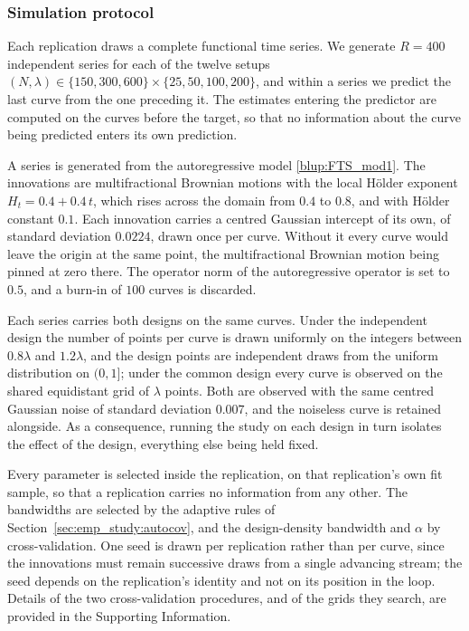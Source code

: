 \subsubsection{\color{magenta}Simulation protocol\color{black}}

\color{magenta}
Each replication draws a complete functional time series. We generate $R = 400$ independent series for each of the twelve setups $(N, \lambda) \in \{150, 300, 600\} \times \{25, 50, 100, 200\}$, and within a series we predict the last curve from the one preceding it. The estimates entering the predictor are computed on the curves before the target, so that no information about the curve being predicted enters its own prediction.

A series is generated from the autoregressive model \eqref{blup:FTS_mod1}. The innovations are multifractional Brownian motions with the local Hölder exponent $H_t = 0.4 + 0.4\,t$, which rises across the domain from $0.4$ to $0.8$, and with Hölder constant $0.1$. Each innovation carries a centred Gaussian intercept of its own, of standard deviation $0.0224$, drawn once per curve. Without it every curve would leave the origin at the same point, the multifractional Brownian motion being pinned at zero there. The operator norm of the autoregressive operator is set to $0.5$, and a burn-in of $100$ curves is discarded.

Each series carries both designs on the same curves. Under the independent design the number of points per curve is drawn uniformly on the integers between $0.8\lambda$ and $1.2\lambda$, and the design points are independent draws from the uniform distribution on $(0,1]$; under the common design every curve is observed on the shared equidistant grid of $\lambda$ points. Both are observed with the same centred Gaussian noise of standard deviation $0.007$, and the noiseless curve is retained alongside. As a consequence, running the study on each design in turn isolates the effect of the design, everything else being held fixed.

Every parameter is selected inside the replication, on that replication's own fit sample, so that a replication carries no information from any other. The bandwidths are selected by the adaptive rules of Section~\ref{sec:emp_study:autocov}, and the design-density bandwidth and $\alpha$ by cross-validation. One seed is drawn per replication rather than per curve, since the innovations must remain successive draws from a single advancing stream; the seed depends on the replication's identity and not on its position in the loop. Details of the two cross-validation procedures, and of the grids they search, are provided in the Supporting Information.
\color{black}

